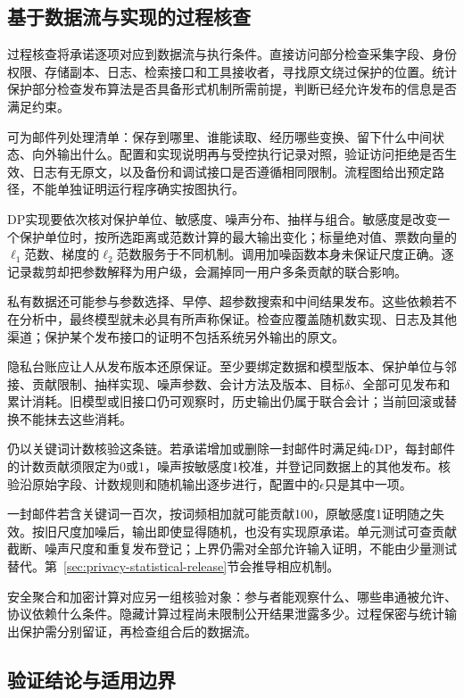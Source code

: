 \subsection{基于数据流与实现的过程核查}
\label{sec:privacy-implementation-verification}

过程核查将承诺逐项对应到数据流与执行条件。直接访问部分检查采集字段、身份权限、存储副本、日志、检索接口和工具接收者，寻找原文绕过保护的位置。统计保护部分检查发布算法是否具备形式机制所需前提，判断已经允许发布的信息是否满足约束。

可为邮件列处理清单：保存到哪里、谁能读取、经历哪些变换、留下什么中间状态、向外输出什么。配置和实现说明再与受控执行记录对照，验证访问拒绝是否生效、日志有无原文，以及备份和调试接口是否遵循相同限制。流程图给出预定路径，不能单独证明运行程序确实按图执行。

DP实现要依次核对保护单位、敏感度、噪声分布、抽样与组合。敏感度是改变一个保护单位时，按所选距离或范数计算的最大输出变化；标量绝对值、票数向量的$\ell_1$范数、梯度的$\ell_2$范数服务于不同机制。调用加噪函数本身未保证尺度正确。逐记录裁剪却把参数解释为用户级，会漏掉同一用户多条贡献的联合影响。

私有数据还可能参与参数选择、早停、超参数搜索和中间结果发布。这些依赖若不在分析中，最终模型就未必具有所声称保证。检查应覆盖随机数实现、日志及其他渠道；保护某个发布接口的证明不包括系统另外输出的原文。

隐私台账应让人从发布版本还原保证。至少要绑定数据和模型版本、保护单位与邻接、贡献限制、抽样实现、噪声参数、会计方法及版本、目标$\delta$、全部可见发布和累计消耗。旧模型或旧接口仍可观察时，历史输出仍属于联合会计；当前回滚或替换不能抹去这些消耗。

仍以关键词计数核验这条链。若承诺增加或删除一封邮件时满足纯$\epsilon$DP，每封邮件的计数贡献须限定为0或1，噪声按敏感度1校准，并登记同数据上的其他发布。核验沿原始字段、计数规则和随机输出逐步进行，配置中的$\epsilon$只是其中一项。

一封邮件若含关键词一百次，按词频相加就可能贡献100，原敏感度1证明随之失效。按旧尺度加噪后，输出即使显得随机，也没有实现原承诺。单元测试可查贡献截断、噪声尺度和重复发布登记；上界仍需对全部允许输入证明，不能由少量测试替代。第~\ref{sec:privacy-statistical-release}节会推导相应机制。

安全聚合和加密计算对应另一组核验对象：参与者能观察什么、哪些串通被允许、协议依赖什么条件。隐藏计算过程尚未限制公开结果泄露多少。过程保密与统计输出保护需分别留证，再检查组合后的数据流。

\subsection{验证结论与适用边界}
\label{sec:privacy-verification-evidence}


